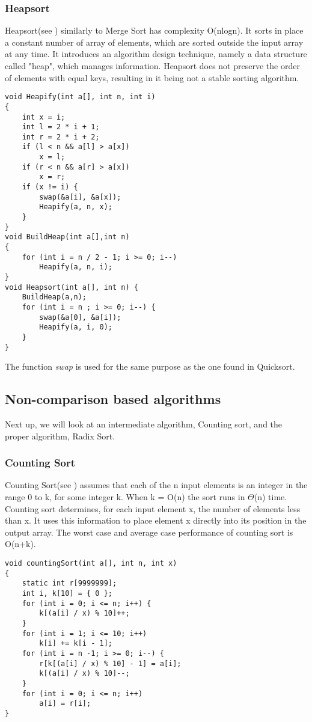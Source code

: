 \documentclass{article}
\numberwithin{figure}{section}
\begin{document}
\subsubsection{Heapsort}

Heapsort(see \cite{Thomas}) similarly to Merge Sort has complexity O(nlogn). It sorts in place a constant number of array of elements, which are sorted outside the input array at any time. It introduces an algorithm design technique, namely a data structure called "heap", which manages information. Heapsort does not preserve the order of elements with equal keys, resulting in it being not a stable sorting algorithm. 

\begin{lstlisting}[frame=none]
void Heapify(int a[], int n, int i)
{
    int x = i;
    int l = 2 * i + 1;
    int r = 2 * i + 2;
    if (l < n && a[l] > a[x])
        x = l;
    if (r < n && a[r] > a[x])
        x = r;
    if (x != i) {
        swap(&a[i], &a[x]);
        Heapify(a, n, x);
    }
}
void BuildHeap(int a[],int n)
{
    for (int i = n / 2 - 1; i >= 0; i--)
        Heapify(a, n, i);
}
void Heapsort(int a[], int n) {
    BuildHeap(a,n);
    for (int i = n ; i >= 0; i--) {
        swap(&a[0], &a[i]);
        Heapify(a, i, 0);
    }
}
\end{lstlisting}
The function \textit{swap} is used for the same purpose as the one found in Quicksort.

\subsection{Non-comparison based algorithms}

Next up, we will look at an intermediate algorithm, Counting sort, and the proper algorithm, Radix Sort.

\subsubsection{Counting Sort}

Counting Sort(see \cite{Thomas}) assumes that each of the n input elements is an integer in the range 0 to k, for some integer k. When k = O(n) the sort runs in $\Theta$(n) time.
Counting sort determines, for each input element x, the number of elements less
than x. It uses this information to place element x directly into its position in the
output array. The worst case and average case performance of counting sort is O(n+k).

\begin{lstlisting}[frame=none]
void countingSort(int a[], int n, int x)
{
    static int r[9999999];
    int i, k[10] = { 0 };
    for (int i = 0; i <= n; i++) {
        k[(a[i] / x) % 10]++;
    }
    for (int i = 1; i <= 10; i++)
        k[i] += k[i - 1];
    for (int i = n -1; i >= 0; i--) {
        r[k[(a[i] / x) % 10] - 1] = a[i];
        k[(a[i] / x) % 10]--;
    }
    for (int i = 0; i <= n; i++)
        a[i] = r[i];
}
\end{lstlisting}
\end{document}
